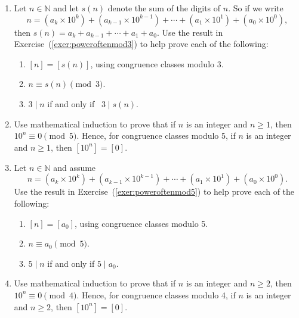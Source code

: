 \begin{enumerate}
\item Let  $n \in \mathbb{N}$ and let  $s( n )$ denote the sum of the digits of  $n$.  \label{exer:divtest3} So if we write
\[
n = \left( {a_k  \times 10^k } \right) + \left( {a_{k - 1}  \times 10^{k - 1} } \right) +  \cdots  + \left( {a_1  \times 10^1 } \right) + \left( {a_0  \times 10^0 } \right), 
\]
then $s( n ) = a_k  + a_{k - 1}  +  \cdots  + a_1  + a_0$.  Use the result in Exercise~(\ref{exer:poweroftenmod3}) to help prove each of the following:

\begin{enumerate}
  \item $[ n ] = [ {s( n )} ]$, using congruence classes modulo 3.

  \item $n \equiv s( n ) \pmod 3$.

  \item $3 \mid n$  if and only if \, $3 \mid s( n )$. \label{T:sumofdigitsmod9-3}
%

\end{enumerate}

\item Use mathematical induction to prove that if  $n$  is an integer and  $n \geq 1$, then  $10^n  \equiv 0 \pmod 5$.  Hence, for congruence classes modulo 5,  if  $n$  is an integer and  $n \geq 1$, then  $[ {10^n } ] = [ 0 ]$.
\label{exer:poweroftenmod5}%

\item Let  $n \in \mathbb{N}$ and assume  \label{exer:divtest5}
\[
n = \left( {a_k  \times 10^k } \right) + \left( {a_{k - 1}  \times 10^{k - 1} } \right) +  \cdots  + \left( {a_1  \times 10^1 } \right) + \left( {a_0  \times 10^0 } \right)\!.
\]
Use the result in Exercise~(\ref{exer:poweroftenmod5}) to help prove each of the following:

\begin{enumerate}
  \item $[ n ] = [ {a_0 } ]$, using congruence classes modulo 5.
  
  \item $n \equiv a_0 \pmod 5$.

  \item $5 \mid n$  if and only if  $5 \mid a_0 $.
%
\end{enumerate}

\item Use mathematical induction to prove that if  $n$  is an integer and  $n \geq 2$, then  $10^n  \equiv 0 \pmod 4$.  Hence, for congruence classes modulo 4,  if  $n$  is an integer and  $n \geq 2$, then  $[ {10^n } ] = [ 0 ]$. 
\label{exer:poweroftenmod4}


\end{enumerate}
